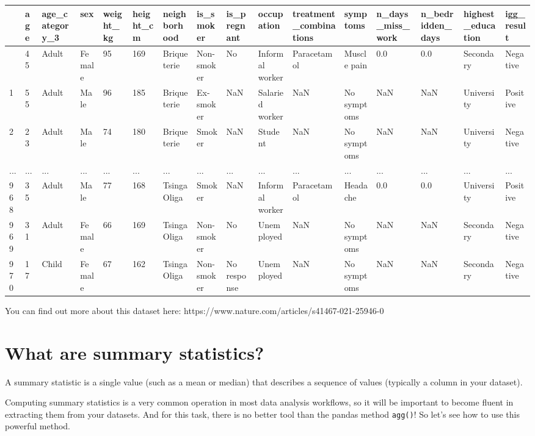 \documentclass[
  letterpaper,
  DIV=11,
  numbers=noendperiod]{scrreprt}
\begin{document}
\begin{longtable}[]{@{}llllllllllllllll@{}}
\toprule\noalign{}
& age & age\_category\_3 & sex & weight\_kg & height\_cm & neighborhood
& is\_smoker & is\_pregnant & occupation & treatment\_combinations &
symptoms & n\_days\_miss\_work & n\_bedridden\_days & highest\_education
& igg\_result \\
\midrule\noalign{}
\endhead
\bottomrule\noalign{}
\endlastfoot
0 & 45 & Adult & Female & 95 & 169 & Briqueterie & Non-smoker & No &
Informal worker & Paracetamol & Muscle pain & 0.0 & 0.0 & Secondary &
Negative \\
1 & 55 & Adult & Male & 96 & 185 & Briqueterie & Ex-smoker & NaN &
Salaried worker & NaN & No symptoms & NaN & NaN & University &
Positive \\
2 & 23 & Adult & Male & 74 & 180 & Briqueterie & Smoker & NaN & Student
& NaN & No symptoms & NaN & NaN & University & Negative \\
... & ... & ... & ... & ... & ... & ... & ... & ... & ... & ... & ... &
... & ... & ... & ... \\
968 & 35 & Adult & Male & 77 & 168 & Tsinga Oliga & Smoker & NaN &
Informal worker & Paracetamol & Headache & 0.0 & 0.0 & University &
Positive \\
969 & 31 & Adult & Female & 66 & 169 & Tsinga Oliga & Non-smoker & No &
Unemployed & NaN & No symptoms & NaN & NaN & Secondary & Negative \\
970 & 17 & Child & Female & 67 & 162 & Tsinga Oliga & Non-smoker & No
response & Unemployed & NaN & No symptoms & NaN & NaN & Secondary &
Negative \\
\end{longtable}

You can find out more about this dataset here:
https://www.nature.com/articles/s41467-021-25946-0

\section{What are summary
statistics?}\label{what-are-summary-statistics}

A summary statistic is a single value (such as a mean or median) that
describes a sequence of values (typically a column in your dataset).

Computing summary statistics is a very common operation in most data
analysis workflows, so it will be important to become fluent in
extracting them from your datasets. And for this task, there is no
better tool than the pandas method \texttt{agg()}! So let's see how to
use this powerful method.
\end{document}

